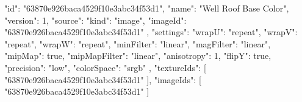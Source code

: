 {
  "id": "63870e926baca4529f10e3abc34f53d1",
  "name": "Well Roof Base Color",
  "version": 1,
  "source": {
    "kind": "image",
    "imageId": "63870e926baca4529f10e3abc34f53d1"
  },
  "settings": {
    "wrapU": "repeat",
    "wrapV": "repeat",
    "wrapW": "repeat",
    "minFilter": "linear",
    "magFilter": "linear",
    "mipMap": true,
    "mipMapFilter": "linear",
    "anisotropy": 1,
    "flipY": true,
    "precision": "low",
    "colorSpace": "srgb"
  },
  "textureIds": [
    "63870e926baca4529f10e3abc34f53d1"
  ],
  "imageIds": [
    "63870e926baca4529f10e3abc34f53d1"
  ]
}
